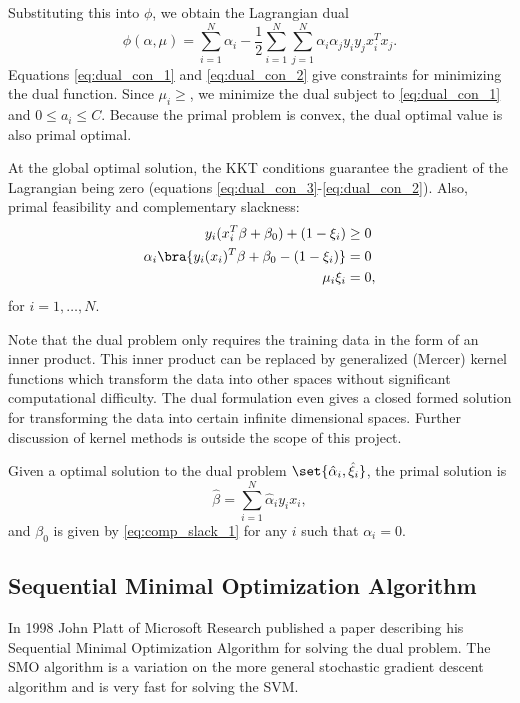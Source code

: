 \documentclass[10pt]{article}
\begin{document}
Substituting this into $\phi$, we obtain the Lagrangian dual
\[
	\phi(\alpha,\mu)=\sum_{i=1}^{N}\alpha_{i}-\frac{1}{2}\sum_{i=1}^{N}\sum_{j=1}^{N}\alpha_{i}\alpha_{j}y_{i}y_{j}x_{i}^{T}x_{j}.
	\]
Equations \eqref{eq:dual_con_1} and \eqref{eq:dual_con_2} give constraints for minimizing the dual function. Since $\mu_{i}\geq$, we minimize the dual subject to
\eqref{eq:dual_con_1} and $0\leq a_{i}\leq C$. Because the primal problem is convex, the dual optimal value is also primal optimal.

At the global optimal solution, the KKT conditions guarantee the gradient of the Lagrangian being zero (equations \eqref{eq:dual_con_3}-\eqref{eq:dual_con_2}). Also, primal feasibility and complementary slackness:
\begin{align}
	y_{i}(x_{i}^{T}\beta+\beta_{0})+(1-\xi_{i})&\geq 0\\
	\alpha_{i}\bra{y_{i}(x_{i})^{T}\beta+\beta_{0}-(1-\xi_{i})}&=0\label{eq:comp_slack_1}\\
	\mu_{i}\xi_{i}&=0,
\end{align}
for $i = 1,\ldots, N$.

Note that the dual problem only requires the training data in the form of an inner product. This inner product can be replaced by generalized (Mercer) kernel functions which transform the data into other spaces without significant computational difficulty. The dual formulation even gives a closed formed solution for transforming the data into certain infinite dimensional spaces. Further discussion of kernel methods is outside the scope of this project.

Given a optimal solution to the dual problem $\set{\hat{\alpha}_{i},\hat{\xi}_{i}}$, the primal solution is
\[
	\hat{\beta}=\sum_{i=1}^{N}\hat{\alpha}_{i}y_{i}x_{i},
\]
and $\beta_{0}$ is given by \eqref{eq:comp_slack_1} for any $i$ such that $\alpha_{i}= 0$.

\subsection{Sequential Minimal Optimization Algorithm} %
\label{sec:smo_algorithm}
In 1998 John Platt of Microsoft Research published a paper  \cite{platt1998sequential} describing his Sequential Minimal Optimization Algorithm for solving the dual problem. The SMO algorithm is a variation on the more general stochastic gradient descent algorithm and is very fast for solving the SVM.
\end{document}
